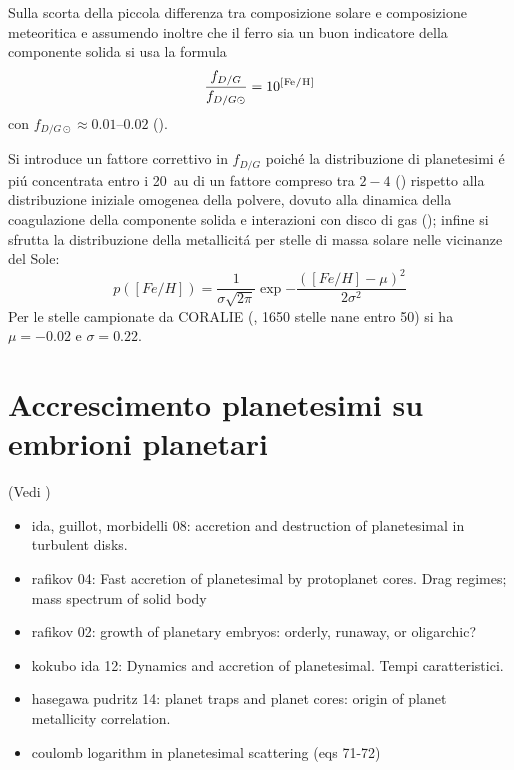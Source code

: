 Sulla scorta della piccola differenza tra composizione solare e composizione meteoritica e assumendo inoltre che il ferro sia un buon indicatore della componente solida  si usa la formula
\begin{equation}
\frac{f_{D/G}}{f_{D/G\odot}}=10\expy{[\cel{Fe}{}{}{}/\cel{H}{}{}{}]}
\end{equation}
con $f_{D/G\odot}\approx\numrange{0.01}{0.02}$ (\cite{lodders2003solar}).

Si introduce un fattore correttivo in $f_{D/G}$ poich\'e la distribuzione di planetesimi \'e pi\'u concentrata entro i \SI{20}{\astronomicalunit} di un fattore compreso tra $2-4$ (\cite{kornet2004alternative}) rispetto alla distribuzione iniziale omogenea della polvere, dovuto alla dinamica della coagulazione della componente solida e interazioni con disco di gas (\cite{kornet2001diversity}); infine si sfrutta la distribuzione della metallicit\'a per stelle di massa solare nelle vicinanze del Sole:
\begin{equation}
p([Fe/H])=\frac{1}{\sigma\sqrt{2\pi}}\exp{-\frac{([Fe/H]-\mu)^2}{2\sigma^2}}
\end{equation}
Per le stelle campionate da CORALIE (\cite{udry2000coralie}, 1650 stelle nane entro \SI{50}{\parsec}) si ha $\mu=-0.02$ e $\sigma=0.22$.

\begin{workout}

\end{workout}


\section{Accrescimento planetesimi su embrioni planetari}
(Vedi \cite{kokubo2012dynamics})

\begin{workout}
	\begin{itemize}
		\item ida, guillot, morbidelli 08: accretion and destruction of planetesimal in turbulent disks.
		\item rafikov 04: Fast accretion of planetesimal by protoplanet cores. Drag regimes; mass spectrum of solid body
		\item rafikov 02: growth of planetary embryos: orderly, runaway, or oligarchic?
		\item kokubo ida 12: Dynamics and accretion of planetesimal. Tempi caratteristici.
		\item hasegawa pudritz 14: planet traps and planet cores: origin of planet metallicity correlation.
		\item coulomb logarithm in planetesimal scattering \cite{rafikov2003planetesimal} (eqs 71-72)
	\end{itemize}
\end{workout}

